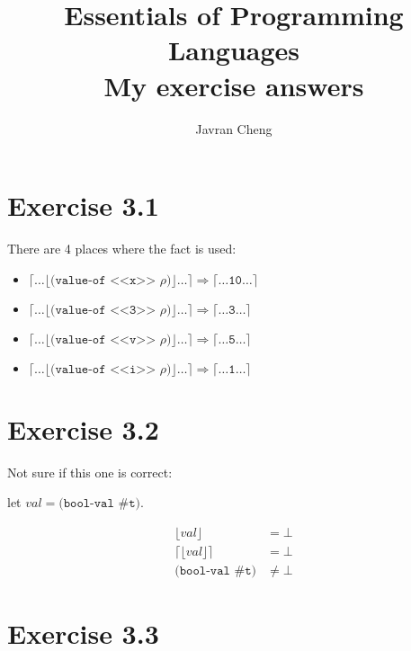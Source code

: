 \documentclass[11pt,a4paper]{article}
\title{Essentials of Programming Languages\\
{\large
My exercise answers}}
\author{Javran Cheng}
\begin{document}
\maketitle

\section{Exercise 3.1}

There are 4 places where the fact is used:

\begin{itemize}
    \item$  \lceil \dots \lfloor
                \texttt{(value-of <<x>> $\rho$)}
            \rfloor \dots \rceil
         \Rightarrow
            \lceil \dots
                \texttt{10}
            \dots \rceil$
    \item$  \lceil \dots \lfloor
                \texttt{(value-of <<3>> $\rho$)}
            \rfloor \dots \rceil
         \Rightarrow
            \lceil \dots
                \texttt{3}
            \dots \rceil$
    \item$  \lceil \dots \lfloor
                \texttt{(value-of <<v>> $\rho$)}
            \rfloor \dots \rceil
         \Rightarrow
            \lceil \dots
                \texttt{5}
            \dots \rceil$
    \item$  \lceil \dots \lfloor
                \texttt{(value-of <<i>> $\rho$)}
            \rfloor \dots \rceil
         \Rightarrow
            \lceil \dots
                \texttt{1}
            \dots \rceil$

\end{itemize}

\section{Exercise 3.2}

Not sure if this one is correct:

let $val = \texttt{(bool-val \#t)}$.

\begin{align*}
    \lfloor val \rfloor & = \bot \\
    \lceil \lfloor val \rfloor \rceil  & = \bot \\
    \texttt{(bool-val \#t)} & \neq \bot
\end{align*}
    
\section{Exercise 3.3}
\end{document}
